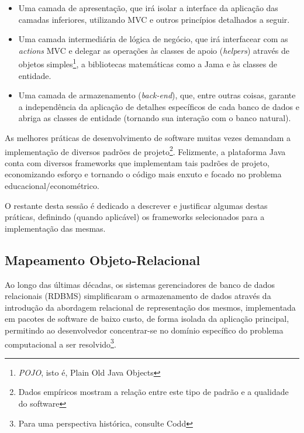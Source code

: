 \documentclass{abnt}
\begin{document}
\begin{itemize}
\item Uma camada de apresentação, que irá isolar a interface da aplicação das camadas inferiores, utilizando MVC e outros princípios detalhados a seguir.

\item Uma camada intermediária de lógica de negócio, que irá interfacear com as \textit{actions} MVC e delegar as operações às classes de apoio (\textit{helpers}) através de objetos simples\footnote{\textit{POJO}, isto é, Plain Old Java Objects}, a bibliotecas matemáticas como a Jama e às classes de entidade.

\item Uma camada de armazenamento (\textit{back-end}), que, entre outras coisas, garante a independência da aplicação de detalhes específicos de cada banco de dados e abriga as classes de entidade (tornando sua interação com o banco natural).

\end{itemize}



As melhores práticas de desenvolvimento de software muitas vezes demandam a implementação de diversos padrões de projeto\footnote{Dados empíricos mostram\cite{IeeeExperience} a relação entre este tipo de padrão e a qualidade do software}. Felizmente, a plataforma Java conta com diversos frameworks que implementam tais padrões de projeto, economizando esforço e tornando o código mais enxuto e focado no problema educacional/econométrico.

O restante desta sessão é dedicado a descrever e justificar algumas destas práticas, definindo (quando aplicável) os frameworks selecionados para a implementação das mesmas.

\subsection{Mapeamento Objeto-Relacional}

Ao longo das últimas décadas, os sistemas gerenciadores de banco de dados relacionais (RDBMS)  simplificaram o armazenamento de dados através da introdução da abordagem relacional de representação dos mesmos, implementada em pacotes de software de baixo custo, de forma isolada da aplicação principal, permitindo ao desenvolvedor concentrar-se no domínio específico do problema computacional a ser resolvido\footnote{Para uma perspectiva histórica, consulte Codd\cite{Codd1970}}.
\end{document}
